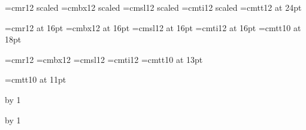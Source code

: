
\newcount\sectionno{}
\newcount\subsectionno{}
\newcount\subsubsectionno{}
\newcount\subsubsubsectionno{}
\newcount\topicno{}

\font\titlerm=cmr12  scaled   \font\titlebf=cmbx12 scaled 
\font\titlesl=cmsl12 scaled   \font\titleit=cmti12 scaled 
\font\titlett=cmtt12 at 24pt

\font\sectionrm=cmr12  at 16pt         \font\sectionbf=cmbx12 at 16pt
\font\sectionsl=cmsl12 at 16pt         \font\sectionit=cmti12 at 16pt
\font\sectiontt=cmtt10 at 18pt

\font\subsectionrm=cmr12               \font\subsectionbf=cmbx12
\font\subsectionsl=cmsl12              \font\subsectionit=cmti12
\font\subsectiontt=cmtt10 at 13pt

\font\bodytt=cmtt10 at 11pt
\def\tt{\fam\ttfam\bodytt}

%
%

\def\title#1\par{{
    \let\rm\titlerm\let\bf\titlebf
    \let\tt\titlett
    \let\it\titleit
    \let\sl\titlesl\rm
    {}}\bigskip}

\def\section#1\par{
    \advance\sectionno by 1
    \vsize{}
    \vsize{}
    \bigskip
    {\let\rm\sectionrm\let\bf\sectionbf
    \let\tt\sectiontt\let\it\sectionit
    \let\sl\sectionsl

\rm{}}
    \nobreak\smallskip\noindent}

\def\subsection#1\par{
    \advance\subsectionno by 1
    \vsize{}
    \vsize{}
    \bigskip
    {\let\rm\subsectionrm\let\bf\subsectionbf
    \let\tt\subsectiontt\let\it\subsectionit
    \let\sl\subsectionsl
    \rm{}}
    \nobreak\smallskip\noindent}

